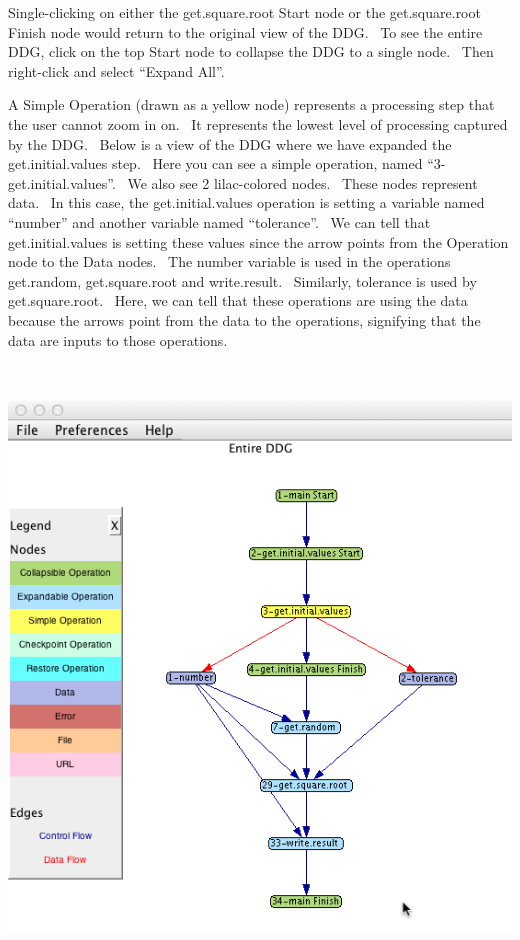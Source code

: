 \documentclass[letterpaper]{article}
\begin{document}
{\mdseries\upshape\color{black}
Single-clicking on either the get.square.root Start node or the get.square.root Finish node would return to the original view of the DDG. \ To see the entire DDG, click on the top Start node to collapse the DDG to a single node. \ Then right-click and select “Expand All”.}

{\mdseries\upshape\color{black}
A Simple Operation (drawn as a yellow node) represents a processing step that the user cannot zoom in on. \ It represents the lowest level of processing captured by the DDG. \ Below is a view of the DDG where we have expanded the get.initial.values step. \ Here you can see a simple operation, named “3-get.initial.values”. \ We also see 2 lilac-colored nodes. \ These nodes represent data. \ In this case, the get.initial.values operation is setting a variable named “number” and another variable named “tolerance”. \ We can tell that get.initial.values is setting these values since the arrow points from the Operation node to the Data nodes. \ The number variable is used in the operations get.random, get.square.root and write.result. \ Similarly, tolerance is used by get.square.root. \ Here, we can tell that these operations are using the data because the arrows point from the data to the operations, signifying that the data are inputs to those operations.}

 \includegraphics[width=5.9654in,height=6.2917in]{UsingDDGExplorer-img/UsingDDGExplorer-img004.png} 
\end{document}
